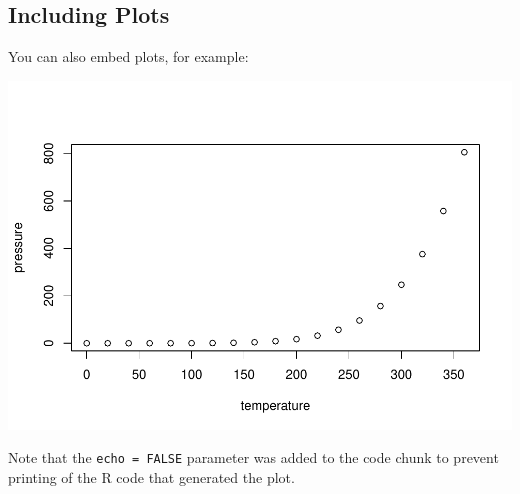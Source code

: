 \documentclass[
]{article}
\begin{document}
\hypertarget{including-plots}{%
\subsection{Including Plots}\label{including-plots}}

You can also embed plots, for example:

\includegraphics{index_files/figure-latex/pressure-1.pdf}

Note that the \texttt{echo\ =\ FALSE} parameter was added to the code
chunk to prevent printing of the R code that generated the plot.
\end{document}
